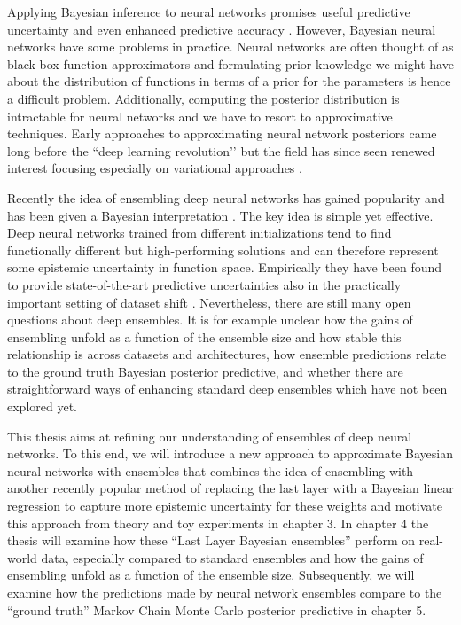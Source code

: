 \documentclass[../thesis.tex]{subfiles}
\begin{document}
Applying Bayesian inference to neural networks promises useful predictive uncertainty and even enhanced predictive accuracy \parencite{wilson2020case}. However, Bayesian neural networks have some problems in practice. Neural networks are often thought of as black-box function approximators and formulating prior knowledge we might have about the distribution of functions in terms of a prior for the parameters is hence a difficult problem. Additionally, computing the posterior distribution is intractable for neural networks and we have to resort to approximative techniques. Early approaches to approximating neural network posteriors came long before the ``deep learning revolution’’ \parencite{mackay1992practical, neal1995bayesian} but the field has since seen renewed interest focusing especially on variational approaches \parencite{graves2011practical, hernandez2015probabilistic, blundell2015weight}. 

Recently the idea of ensembling deep neural networks has gained popularity \parencite{lakshminarayanan2017simple} and has been given a Bayesian interpretation \parencite{wilson2020bayesian}. The key idea is simple yet effective. Deep neural networks trained from different initializations tend to find functionally different but high-performing solutions and can therefore represent some epistemic uncertainty in function space. Empirically they have been found to provide state-of-the-art predictive uncertainties also in the practically important setting of dataset shift \parencite{ovadia2019can}. Nevertheless, there are still many open questions about deep ensembles. It is for example unclear how the gains of ensembling unfold as a function of the ensemble size and how stable this relationship is across datasets and architectures, how ensemble predictions relate to the ground truth Bayesian posterior predictive, and whether there are straightforward ways of enhancing standard deep ensembles which have not been explored yet.

This thesis aims at refining our understanding of ensembles of deep neural networks. To this end, we will introduce a new approach to approximate Bayesian neural networks with ensembles that combines the idea of ensembling with another recently popular method of replacing the last layer with a Bayesian linear regression to capture more epistemic uncertainty for these weights and motivate this approach from theory and toy experiments in chapter 3. In chapter 4 the thesis will examine how these ``Last Layer Bayesian ensembles'' perform on real-world data, especially compared to standard ensembles and how the gains of ensembling unfold as a function of the ensemble size. Subsequently, we will examine how the predictions made by neural network ensembles compare to the ``ground truth'' Markov Chain Monte Carlo posterior predictive in chapter 5. 
\end{document}

